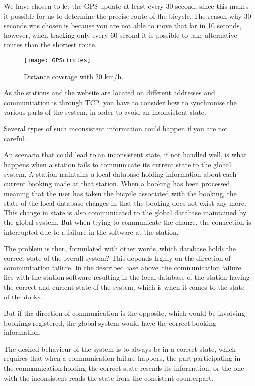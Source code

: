 \begin{description}[style=nextline]
We have chosen to let the GPS update at least every 30 second, since this makes it possible for us to determine the precise route of the bicycle.
The reason why 30 seconds was chosen is because you are not able to move that far in 10 seconds, however, when tracking only every 60 second it is possible to take alternative routes than the shortest route.


\begin{figure}
	\centering
	\texttt{[image: GPScircles]}
	\caption{Distance coverage with 20 km/h.}
	\label{fig:gpsCircles}
\end{figure}

\item[Problem 1.4]
As the stations and the website are located on different addresses and communication is through TCP, you have to consider how to synchronise the various parts of the system, in order to avoid an inconsistent state.

Several types of such inconsistent information could happen if you are not careful.

An scenario that could lead to an inconsistent state, if not handled well, is what happens when a station fails to communicate its current state to the global system.
A station maintains a local database holding information about each current booking made at that station.
When a booking has been processed, meaning that the user has taken the bicycle associated with the booking, the state of the local database changes in that the booking does not exist any more.
This change in state is also communicated to the global database maintained by the global system.
But when trying to communicate the change, the connection is interrupted due to a failure in the software at the station.

The problem is then, formulated with other words, which database holds the correct state of the overall system?
This depends highly on the direction of communication failure. 
In the described case above, the communication failure lies with the station software resulting in the local database of the station having the correct and current state of the system, which is when it comes to the state of the docks.


But if the direction of communication is the opposite, which would be involving bookings registered, the global system would have the correct booking information.

The desired behaviour of the system is to always be in a correct state, which requires that when a communication failure happens, the part participating in the communication holding the correct state resends its information, or the one with the inconsistent reads the state from the consistent counterpart.


\end{description}
